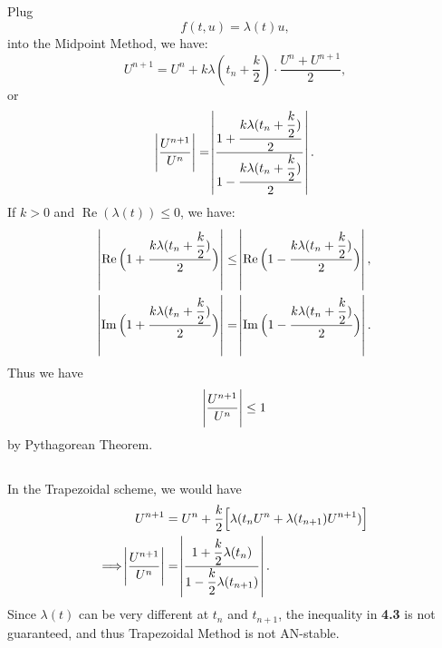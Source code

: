 \documentclass[11pt]{article}
\begin{document}
\subsection{}
Plug
\begin{equation}
    f(t, u) = \lambda(t)u,
\nonumber\end{equation}
into the Midpoint Method, we have:
\begin{equation}
    U^{n+1} = U^n + k\lambda(t_n + \dfrac k2)\cdot\dfrac{U^n+U^{n+1}}2,
\nonumber\end{equation}
or
\begin{equation}
    \abs{\dfrac{U^{n+1}}{U^n}} =
    \abs{\dfrac{1+\dfrac{k\lambda(t_n+\dfrac k2)}2}{1-\dfrac{k\lambda(t_n+\dfrac k2)}2}}.
\end{equation}
If $k>0$ and $\operatorname{Re}(\lambda(t)) \leq 0$, we have:
\begin{equation}\begin{split}
    \abs{\operatorname{Re}\Big(1+\dfrac{k\lambda(t_n+\dfrac k2)}2\Big)}
    &\leq\abs{\operatorname{Re}\Big(1-\dfrac{k\lambda(t_n+\dfrac k2)}2\Big)},\\
    \abs{\operatorname{Im}\Big(1+\dfrac{k\lambda(t_n+\dfrac k2)}2\Big)}
    &=\abs{\operatorname{Im}\Big(1-\dfrac{k\lambda(t_n+\dfrac k2)}2\Big)}.
\end{split}\end{equation}
Thus we have
\begin{equation}
    \abs{\dfrac{U^{n+1}}{U^n}} \leq 1
\end{equation}
by Pythagorean Theorem.

\subsection{}
In the Trapezoidal scheme, we would have 
\begin{equation}\begin{split}
    U^{n+1} &= U^n + \dfrac k2 \Big[ \lambda(t_nU^n + \lambda(t_{n+1})U^{n+1})\Big]\\
    \Longrightarrow
    \abs{\dfrac{U^{n+1}}{U^n}} &= \abs{\dfrac{1+\dfrac k2\lambda(t_n)}
        {1-\dfrac k2 \lambda(t_{n+1})}}.
\end{split}\end{equation}
Since $\lambda(t)$ can be very different at $t_n$ and $t_{n+1}$, 
the inequality in \textbf{4.3} is not guaranteed, and thus Trapezoidal Method is not AN-stable.
\end{document}
